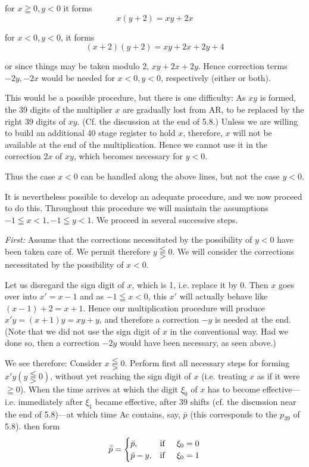 \documentclass[12pt]{amsart}
\begin{document}
for $x \geqq 0, y < 0$ it forms
\[
x(y + 2) = xy + 2x
\]

for $x < 0, y < 0$, it forms
\[
(x + 2)(y + 2) = xy + 2x + 2y + 4
\]

or since things may be taken modulo 2, $xy + 2x + 2y$. Hence correction terms $-2y, -2x$ would be needed for $x < 0, y < 0$, respectively (either or both).

This would be a possible procedure, but there is one difficulty: As $xy$ is formed, the 39 digits of the multiplier $x$ are gradually lost from AR, to be replaced by the right 39 digits of $xy$. (Cf. the discussion at the end of 5.8.) Unless we are willing to build an additional 40 stage register to hold $x$, therefore, $x$ will not be available at the end of the multiplication. Hence we cannot use it in the correction $2x$ of $xy$, which becomes necessary for $y < 0$.

Thus the case $x < 0$ can be handled along the above lines, but not the case $y < 0$.

It is nevertheless possible to develop an adequate procedure, and we now proceed to do this. Throughout this procedure we will maintain the assumptions $-1 \leqq x < 1, -1 \leqq y < 1$. We proceed in several successive steps.

\emph{First:} Assume that the corrections necessitated by the possibility of $y < 0$ have been taken care of. We permit therefore $y \lesseqqgtr 0$. We will consider the corrections necessitated by the possibility of $x < 0$.

Let us disregard the sign digit of $x$, which is 1, i.e. replace it by 0. Then $x$ goes over into $x' = x - 1$ and as $-1 \leqq x< 0$, this $x'$ will actually behave like $(x - 1) + 2 = x + 1$. Hence our multiplication procedure will produce $x'y = (x + 1)y = xy + y$, and therefore a correction $-y$ is needed at the end. (Note that we did not use the sign digit of $x$ in the conventional way. Had we done so, then a correction $-2y$ would have been necessary, as seen above.)

We see therefore: Consider $x \lesseqqgtr 0$. Perform first all necessary steps for forming $x'y (y \lesseqqgtr 0)$, without yet reaching the sign digit of $x$ (i.e. treating $x$ as if it were $\geqq 0$). When the time arrives at which the digit $\xi_0$ of $x$ has to become effective---i.e. immediately after $\xi_1$ became effective, after 39 shifts (cf. the discussion near the end of 5.8)---at which time Ac contains, say, $\bar{p}$ (this corresponds to the $p_{39}$ of 5.8). then form
\[
\bar{\bar{p}} = 
\begin{cases}
    \bar{p},& \text{if} \hspace{5 mm} \xi_0 = 0\\
    \bar{p} - y,& \text{if} \hspace{5 mm} \xi_0 = 1
\end{cases}
\]
\end{document}
